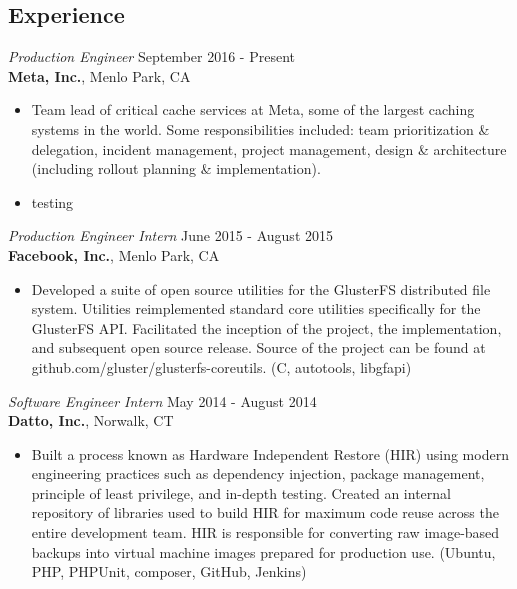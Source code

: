 \documentclass[margin]{res}
\begin{document}
\begin{resume}
\section{Experience}

{\sl Production Engineer} \hfill September 2016 - Present \\
\textbf{Meta, Inc.}, Menlo Park, CA
\begin{itemize}
    \item[] Team lead of critical cache services at Meta, some of the largest caching systems in the world. Some responsibilities included: team prioritization \& delegation, incident management, project management, design \& architecture (including rollout planning \& implementation).

    \item[] testing
\end{itemize}

{\sl Production Engineer Intern} \hfill June 2015 - August 2015 \\
\textbf{Facebook, Inc.}, Menlo Park, CA
\begin{itemize}
    \item[] Developed a suite of open source utilities for the GlusterFS
          distributed file system. Utilities reimplemented standard core
          utilities specifically for the GlusterFS API. Facilitated the
          inception of the project, the implementation, and subsequent open
          source release. Source of the project can be found at
          github.com/gluster/glusterfs-coreutils.
          (C, autotools, libgfapi)
\end{itemize}

{\sl Software Engineer Intern} \hfill May 2014 - August 2014 \\
\textbf{Datto, Inc.}, Norwalk, CT
\begin{itemize}
    \item[] Built a process known as Hardware Independent Restore (HIR) using
          modern engineering practices such as dependency injection, package
          management, principle of least privilege, and in-depth testing.
          Created an internal repository of libraries used to build HIR for
          maximum code reuse across the entire development team. HIR is
          responsible for converting raw image-based backups into virtual
          machine images prepared for production use.
          (Ubuntu, PHP, PHPUnit, composer, GitHub, Jenkins)
\end{itemize}


\end{resume}
\end{document}
